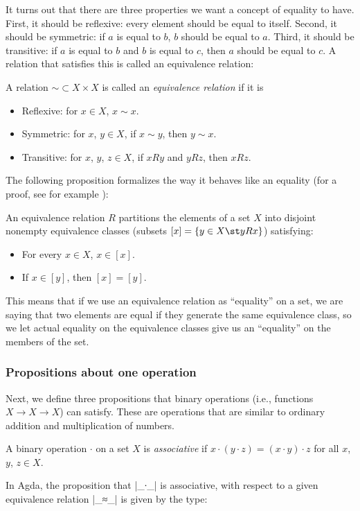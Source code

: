 It turns out that there are three properties we want a concept of equality to have. First, it should be reflexive: every element should be equal to itself. Second, it should be symmetric: if $a$ is equal to $b$, $b$ should be equal to $a$. Third, it should be transitive: if $a$ is equal to $b$ and $b$ is equal to $c$, then $a$ should be equal to $c$. A relation that satisfies this is called an equivalence relation:
\begin{Definition}
  A relation $\sim \subset X \times X$ is called an \emph{equivalence relation} if it is
  \begin{itemize}
  \item Reflexive: for $x \in X$, $x \sim x$.
  \item Symmetric: for $x$, $y \in X$, if $x \sim y$, then $y \sim x$.
  \item Transitive: for $x$, $y$, $z \in X$, if $x R y$ and $y R z$, then $x R z$.
  \end{itemize}
\end{Definition}
The following proposition formalizes the way it behaves like an equality (for a proof, see for example \cite{Equivalence-proof}):
\begin{Proposition}
An equivalence relation $R$ partitions the elements of a set $X$ into disjoint nonempty equivalence classes (subsets $[x] = \{y \in X \st y R x\}$) satisfying: 
\begin{itemize}
\item For every $x \in X$, $x \in [x]$.
\item If $x \in [y]$, then $[x] = [y]$.
\end{itemize}
\end{Proposition}
This means that if we use an equivalence relation as ``equality'' on a set, we are saying that two elements are equal if they generate the same equivalence class, so we let actual equality on the equivalence classes give us an ``equality'' on the members of the set.





\subsubsection{Propositions about one operation}
Next, we define three propositions that binary operations (i.e., functions $X \to X \to X$) can satisfy. These are operations that are similar to ordinary addition and multiplication of numbers.
\begin{Definition} %
A binary operation $\cdot$ on a set $X$ is \emph{associative} if $x \cdot (y \cdot z) = (x \cdot y) \cdot z$ for all $x$, $y$, $z \in X$.
\end{Definition}
In Agda, the proposition that |_∙_| is associative, with respect to a given equivalence relation |_≈_| is given by the type:


